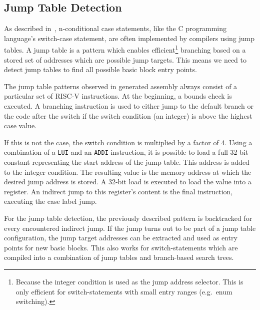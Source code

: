 \documentclass[course=eragp]{aspdoc}
\begin{document}

\subsection{Jump Table Detection}

As described in\ \cite{jump_table_paper}, n-conditional case statements, like the C programming
language's switch-case statement, are often implemented by compilers using jump
tables. A jump table is a pattern which enables efficient\footnote{Because the integer condition is
    used as the jump address selector. This is only efficient for switch-statements with small entry
    ranges (e.g.\ enum switching).} branching based
on a stored set of addresses which are possible jump targets. This means we need to detect jump tables to find
all possible basic block entry points.

\par

The jump table patterns observed in generated assembly always consist of a particular set of RISC-V instructions.
At the beginning, a bounds check is executed. A branching instruction is used to either jump to the
default branch or the code after the switch if the switch condition (an integer) is above the
highest case value.

\par

If this is not the case, the switch condition is multiplied by a factor of 4.
Using a combination of a \texttt{LUI} and an \texttt{ADDI} instruction, it is possible to load a full
32-bit constant\cite{rvspec} representing the start address of the jump table.
This address is added to the integer condition. The resulting value is the memory address
at which the desired jump address is stored. A 32-bit load is executed to load the value into a
register. An indirect jump to this register's content is the final instruction, executing the case
label jump.

\par

For the jump table detection, the previously described pattern is backtracked for every
encountered indirect jump. If the jump turns out to be part of a jump table configuration, the jump
target addresses can be extracted and used as entry points for new basic blocks. This also works
for switch-statements which are compiled into a combination of jump tables and branch-based search
trees.
\end{document}
